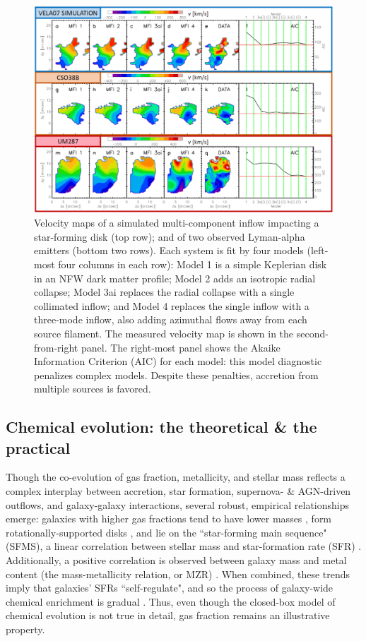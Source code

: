 \begin{figure}
    \centering
    \includegraphics[width=\textwidth]{kcwi_inflows}
    \caption[Simulations and reported observations ($z \sim 2.5$) of multi-filament inflows]{\fixspacing Velocity maps of a simulated multi-component inflow impacting a star-forming disk (top row); and of two observed Lyman-alpha emitters (bottom two rows). Each system is fit by four models (left-most four columns in each row): Model 1 is a simple Keplerian disk in an NFW dark matter profile; Model 2 adds an isotropic radial collapse; Model 3ai replaces the radial collapse with a single collimated inflow; and Model 4 replaces the single inflow with a three-mode inflow, also adding azimuthal flows away from each source filament. The measured velocity map is shown in the second-from-right panel. The right-most panel shows the Akaike Information Criterion (AIC) for each model: this model diagnostic penalizes complex models. Despite these penalties, accretion from multiple sources is favored.}
    \label{fig:kcwi_inflows}
\end{figure}

\subsection{Chemical evolution: the theoretical \& the practical}

Though the co-evolution of gas fraction, metallicity, and stellar mass reflects a complex interplay between accretion, star formation, supernova- \& AGN-driven outflows, and galaxy-galaxy interactions, several robust, empirical relationships emerge: galaxies with higher gas fractions tend to have lower masses \citep{de-blok_96}, form rotationally-supported disks \citep{mcgaugh_de-blok_97}, and lie on the ``star-forming main sequence" (SFMS), a linear correlation between stellar mass and star-formation rate (SFR) \citep{brinchmann_04_sfms}. Additionally, a positive correlation is observed between galaxy mass and metal content (the mass-metallicity relation, or MZR) \citep{tremonti_mz}. When combined, these trends imply that galaxies' SFRs ``self-regulate", and so the process of galaxy-wide chemical enrichment is gradual \citep{finlator_dave_oppenheimer_12,fu_kauffmann_13}. Thus, even though the closed-box model of chemical evolution is not true in detail, gas fraction remains an illustrative property.

